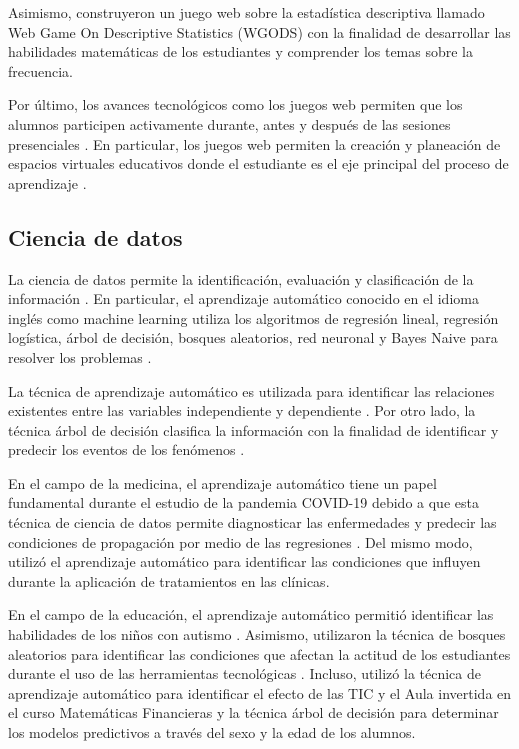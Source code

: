 \documentclass[spanish]{textolivre}
\begin{document}
Asimismo, \textcite{salas-rueda2020} construyeron un juego web sobre la estadística descriptiva llamado Web Game On Descriptive Statistics (WGODS) con la finalidad de desarrollar las habilidades matemáticas de los estudiantes y comprender los temas sobre la frecuencia.

Por último, los avances tecnológicos como los juegos web permiten que los  alumnos participen activamente durante, antes y después de las sesiones presenciales \cite{donald2017, felszeghy2019, licorish2018}. En particular, los juegos web permiten la creación y planeación de espacios virtuales educativos donde el estudiante es el eje principal del proceso de aprendizaje \cite{de_la_pena_esteban2020, ypsilanti2014}.

\subsection{Ciencia de datos}
La ciencia de datos permite la identificación, evaluación y clasificación de la información \cite{hilbert2021, lezhnina2021}. En particular, el aprendizaje automático conocido en el idioma inglés como machine learning utiliza los algoritmos de regresión lineal, regresión logística, árbol de decisión, bosques aleatorios, red neuronal y Bayes Naive para resolver los problemas \cite{chadaga2021, radwan2017}.

La técnica de aprendizaje automático es utilizada para identificar las relaciones existentes entre las variables independiente y dependiente \cite{chadaga2021, lezhnina2021, radwan2017}. Por otro lado, la técnica árbol de decisión clasifica la información con la finalidad de identificar y predecir los eventos de los fenómenos \cite{chadaga2021}.

En el campo de la medicina, el aprendizaje automático tiene un papel fundamental durante el estudio de la pandemia COVID-19 debido a que esta técnica de ciencia de datos permite diagnosticar las enfermedades y predecir las condiciones de propagación por medio de las regresiones \cite{chadaga2021}. Del mismo modo, \textcite{hilbert2021} utilizó el aprendizaje automático para identificar las condiciones que influyen durante la aplicación de tratamientos en las clínicas.

En el campo de la educación, el aprendizaje automático permitió identificar las habilidades de los niños con autismo \cite{radwan2017}. Asimismo, \textcite{lezhnina2021} utilizaron la técnica de bosques aleatorios para identificar las condiciones que afectan la actitud de los estudiantes durante el uso de las herramientas tecnológicas \cite{lezhnina2021}. Incluso, \textcite{salas-rueda2021} utilizó la técnica de aprendizaje automático para identificar el efecto de las TIC y el Aula invertida en el curso Matemáticas Financieras y la técnica árbol de decisión para determinar los modelos predictivos a través del sexo y la edad de los alumnos.
\end{document}
